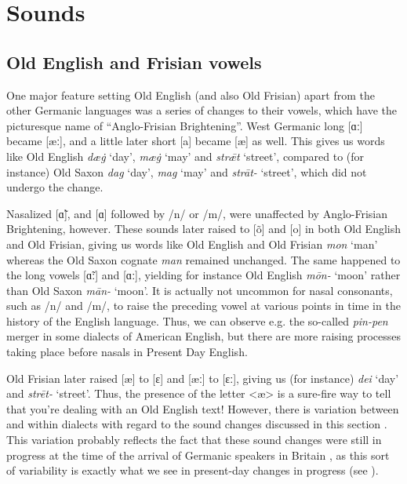 \section{Sounds}\label{prehistory-sounds}
\subsection{Old English and Frisian vowels}\label{prehistory-vowels}
One major feature setting Old English (and also Old Frisian) apart from the other Germanic languages was a series of changes to their vowels, which have the picturesque name of ``Anglo-Frisian Brightening''. West Germanic long [ɑː] became [æː], and a little later short [a] became [æ] as well. This gives us words like Old English \emph{dæġ} `day', \emph{mæġ} `may' and \emph{strǣt} `street', compared to (for instance) Old Saxon \emph{dag} `day', \emph{mag} `may' and \emph{strāt-} `street', which did not undergo the change.

Nasalized [ɑ̃], and [ɑ] followed by /n/ or /m/, were unaffected by Anglo-Frisian Brightening, however. These sounds later raised to [õ] and [o] in both Old English and Old Frisian, giving us words like Old English and Old Frisian \emph{mon} `man' whereas the Old Saxon cognate \emph{man} remained unchanged. The same happened to the long vowels [ɑ̃ː] and [ɑː], yielding for instance Old English \emph{mōn-} `moon' rather than Old Saxon \emph{mān-} `moon'. It is actually not uncommon for nasal consonants, such as /n/ and /m/, to raise the preceding vowel at various points in time in the history of the English language. Thus, we can observe e.g. the so-called \emph{pin-pen} merger in some dialects of American English, but there are more raising processes taking place before nasals in Present Day English.

Old Frisian later raised [æ] to [ɛ] and [æː] to [ɛː], giving us (for instance) \emph{dei} `day' and \emph{strēt-} `street'. Thus, the presence of the letter <æ> is a sure-fire way to tell that you're dealing with an Old English text! However, there is variation between and within dialects with regard to the sound changes discussed in this section \citep[167--170]{RingeTaylor2014}. This variation probably reflects the fact that these sound changes were still in progress at the time of the arrival of Germanic speakers in Britain \citep{Toon1992}, as this sort of variability is exactly what we see in present-day changes in progress (see ).

